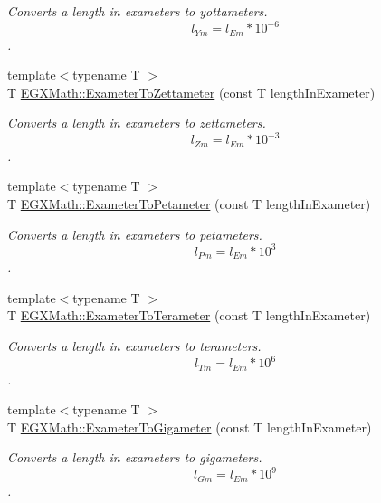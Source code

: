 \begin{DoxyCompactItemize}
\begin{DoxyCompactList}\small\item\em Converts a length in exameters to yottameters. \[ l_{Ym}=l_{Em} * 10^{-6} \]. \end{DoxyCompactList}\item 
{\footnotesize template$<$typename T $>$ }\\T \mbox{\hyperlink{group___e_g_x_math-_conversions-_length_conversions-_s_i-_exameter-_s_i_gaa971cb3b6d17c5e7772d180b2606e42b}{E\+G\+X\+Math\+::\+Exameter\+To\+Zettameter}} (const T length\+In\+Exameter)
\begin{DoxyCompactList}\small\item\em Converts a length in exameters to zettameters. \[ l_{Zm}=l_{Em} * 10^{-3} \]. \end{DoxyCompactList}\item 
{\footnotesize template$<$typename T $>$ }\\T \mbox{\hyperlink{group___e_g_x_math-_conversions-_length_conversions-_s_i-_exameter-_s_i_gadf7ed11d79b89826a108cd01e4f67769}{E\+G\+X\+Math\+::\+Exameter\+To\+Petameter}} (const T length\+In\+Exameter)
\begin{DoxyCompactList}\small\item\em Converts a length in exameters to petameters. \[ l_{Pm}=l_{Em} * 10^{3} \]. \end{DoxyCompactList}\item 
{\footnotesize template$<$typename T $>$ }\\T \mbox{\hyperlink{group___e_g_x_math-_conversions-_length_conversions-_s_i-_exameter-_s_i_gaf16e87fbeccc6175baa72ed6bb9db027}{E\+G\+X\+Math\+::\+Exameter\+To\+Terameter}} (const T length\+In\+Exameter)
\begin{DoxyCompactList}\small\item\em Converts a length in exameters to terameters. \[ l_{Tm}=l_{Em} * 10^{6} \]. \end{DoxyCompactList}\item 
{\footnotesize template$<$typename T $>$ }\\T \mbox{\hyperlink{group___e_g_x_math-_conversions-_length_conversions-_s_i-_exameter-_s_i_gae0a019ba27e962c891f014ae4748fd14}{E\+G\+X\+Math\+::\+Exameter\+To\+Gigameter}} (const T length\+In\+Exameter)
\begin{DoxyCompactList}\small\item\em Converts a length in exameters to gigameters. \[ l_{Gm}=l_{Em} * 10^{9} \]. \end{DoxyCompactList}\item 

\end{DoxyCompactItemize}
